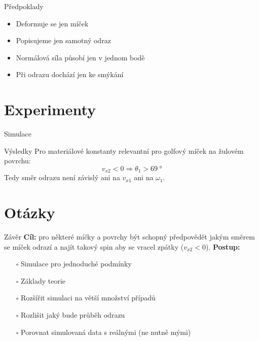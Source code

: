 \documentclass{beamer}
\begin{document}
 \begin{frame}{Předpoklady}
 \begin{itemize}
  \item Deformuje se jen míček
  \item Popisujeme jen samotný odraz
  \item Normálová síla působí jen v jednom bodě
  \item Při odrazu dochází jen ke smýkání 
 \end{itemize}
\end{frame}

\section{Experimenty}

\begin{frame}{Simulace}
 \centering

\end{frame}

 \begin{frame}{Výsledky}
 Pro materiálové konstanty relevantní pro golfový míček na žulovém povrchu:
 \[
  v_{x2} < 0 \Rightarrow \theta_1 > \qty{69}{\degree}
 \]
 Tedy směr odrazu není závislý ani na $v_{x1}$ ani na $\omega_1$.
\end{frame}

\section{Otázky}

\begin{frame}{Závěr}
 \textbf{Cíl:} pro některé míčky a povrchy být schopný předpovědět jakým směrem
 se míček odrazí a najít takový spin aby se vracel zpátky ($v_{x2}<0$).
 \vfill
 \textbf{Postup:}\\
 \begin{itemize}
  \item[\rlap{\raisebox{0.3ex}{\hspace{0.4ex}\tiny \ding{52}}}$\square$]
  Simulace pro jednoduché podmínky
  
  \item[\rlap{\raisebox{0.3ex}{\hspace{0.4ex}\tiny \ding{52}}}$\square$]
  Základy teorie 
 \item[$\square$] Rozšířit simulaci na větší množství případů
 \item[$\square$] Rozlišit jaký bude průběh odrazu
 \item[$\square$] Porovnat simulovaná data s reálnými (ne nutně mými)
 \end{itemize}

\end{frame}
\end{document}

